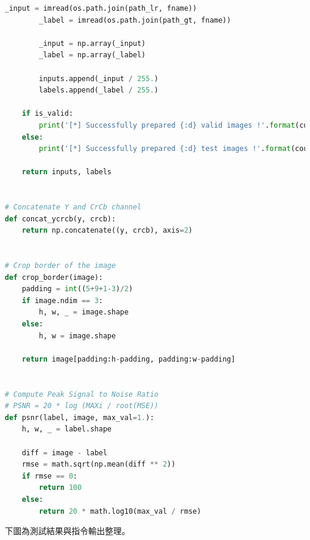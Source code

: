 \documentclass[11pt,UTF8]{ctexart}
\begin{document}
\begin{lstlisting}[language={python}]
        _input = imread(os.path.join(path_lr, fname))
        _label = imread(os.path.join(path_gt, fname))
    
        _input = np.array(_input)
        _label = np.array(_label)
        
        inputs.append(_input / 255.)
        labels.append(_label / 255.)

    if is_valid:
        print('[*] Successfully prepared {:d} valid images !'.format(count))
    else:
        print('[*] Successfully prepared {:d} test images !'.format(count))
        
    return inputs, labels


# Concatenate Y and CrCb channel
def concat_ycrcb(y, crcb):
    return np.concatenate((y, crcb), axis=2)


# Crop border of the image
def crop_border(image):
    padding = int((5+9+1-3)/2)
    if image.ndim == 3:
        h, w, _ = image.shape
    else:
        h, w = image.shape

    return image[padding:h-padding, padding:w-padding]


# Compute Peak Signal to Noise Ratio
# PSNR = 20 * log (MAXi / root(MSE))
def psnr(label, image, max_val=1.):
    h, w, _ = label.shape

    diff = image - label
    rmse = math.sqrt(np.mean(diff ** 2))
    if rmse == 0:
        return 100
    else:
        return 20 * math.log10(max_val / rmse)
	\end{lstlisting}

下圖為測試結果與指令輸出整理。
	
\end{document}
